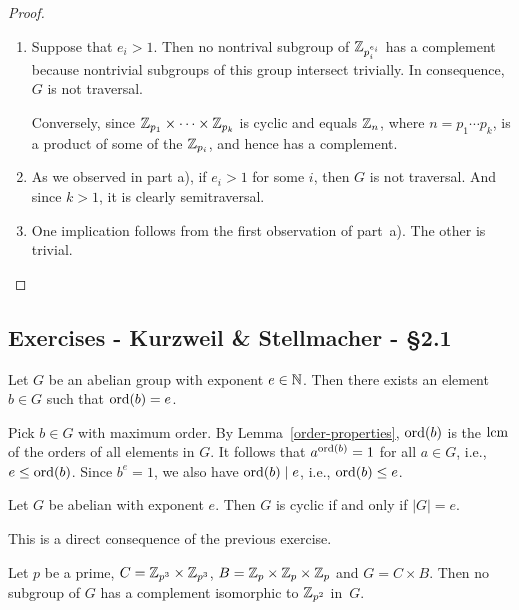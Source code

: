 \begin{proof}${}$
\begin{enumerate}[\upshape a)]
    \item Suppose that $e_i>1$. Then no nontrival subgroup of $\mathbb{Z}_{p_i^{e_i}}$ has a complement because nontrivial subgroups of this group intersect trivially. In consequence, $G$ is not traversal.
    
    Conversely, since $\mathbb{Z}_{p_1}\times\cdots\times\mathbb{Z}_{p_k}$ is cyclic and equals $\mathbb{Z}_n$, where $n=p_1\cdots p_k$, is a product of some of the $\mathbb{Z}_{p_i}$, and hence has a complement.

    \item As we observed in part a), if $e_i>1$ for some $i$, then $G$ is not traversal. And since $k>1$, it is clearly semitraversal.

    \item One implication follows from the first observation of part~a). The other is trivial.
\end{enumerate}
\end{proof}

\subsection{Exercises - Kurzweil \& Stellmacher - \S 2.1}

\begin{exr}
    Let\/ $G$ be an abelian group with exponent $e \in \mathbb{N}$. Then there exists an element\/ $b \in G$ such that\/ ${\rm ord}(b) = e$.
\end{exr}

\begin{solution} Pick $b\in G$ with maximum order. By Lemma~\ref{order-properties}, ${\rm ord}(b)$ is the $\operatorname{lcm}$ of the orders of all elements in $G$. It follows that $a^{{\rm ord}(b)}=1$ for all $a\in G$, i.e., $e\le{\rm ord}(b)$. Since $b^e=1$, we also have ${\rm ord}(b)\mid e$, i.e., ${\rm ord}(b)\le e$.  \end{solution}

\begin{exr}
    Let\/ $G$ be abelian with exponent\/ $e$. Then\/ $G$ is cyclic if and only if\/ $|G| = e$.
\end{exr}

\begin{solution} This is a direct consequence of the previous exercise.  \end{solution}

\begin{exr}
    Let\/ $p$ be a prime, $C = \mathbb{Z}_{p^3} \times \mathbb{Z}_{p^3}$, $B = \mathbb{Z}_p \times \mathbb{Z}_p \times \mathbb{Z}_p$ and\/ $G = C \times B$. Then no subgroup of\/ $G$ has a complement isomorphic to\/ $\mathbb{Z}_{p^2}$ in\/~$G$.
\end{exr}

